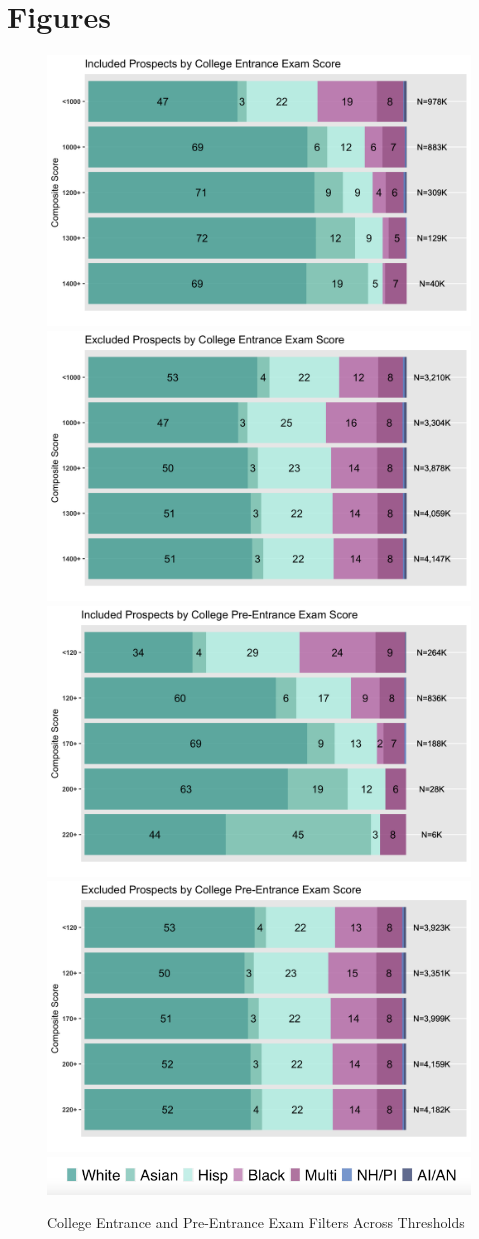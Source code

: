 \documentclass[
  12pt,
]{article}
\begin{document}
\clearpage

\newpage

\hypertarget{figures}{%
\section{Figures}\label{figures}}

\begin{figure}

{\centering \includegraphics[width=0.35\linewidth]{./../../outputs/figures/p2_sat_incv2} \includegraphics[width=0.35\linewidth]{./../../outputs/figures/p2_sat_excv2} \includegraphics[width=0.35\linewidth]{./../../outputs/figures/p2_psat_incv2} \includegraphics[width=0.35\linewidth]{./../../outputs/figures/p2_psat_excv2} \includegraphics[width=0.35\linewidth]{./../../outputs/figures/legend_horizontal} 

}

\caption{College Entrance and Pre-Entrance Exam Filters Across Thresholds}\label{fig:thresholds-tests}
\end{figure}

\begingroup
\fontsize{8}{8}\selectfont
\end{document}
